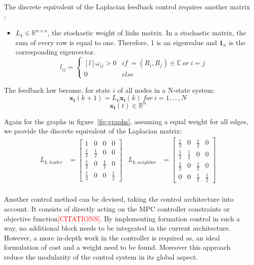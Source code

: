 \documentclass[a4paper, 12pt]{report}
\begin{document}
The discrete equivalent of the Laplacian feedback control requires another matrix \cite{Moreau2005}:
\begin{itemize}
\item $L_k \in \mathbb{R}^{n \times n}$, the stochastic weight of links matrix. In a stochastic matrix, the sum of every row is equal to one. Therefore, 1 is an eigenvalue and $\boldsymbol{1}_n$ is the corresponding eigenvector.
\[l_{ij} =  \left\{ \begin{matrix*}[l] \omega_{ij} > 0 & if\  = (R_i, R_j) \in \mathbb{E}\ or\ i=j\\ 0 & else \end{matrix*} \right.\]
\end{itemize}

The feedback law become, for state $i$ of all nodes in a N-state system:
\[ \boldsymbol{x_i}(k+1) = L_k\boldsymbol{x_i}(k)\ for\ i=1, ..., N \]
\[\boldsymbol{x_i}(t) \in \mathbb{R}^n\]

Again for the graphs in figure~\ref{fig:graphs}, assuming a equal weight for all edges, we provide the discrete equivalent of the Laplacian matrix:
\begin{displaymath}
\begin{aligned}
L_{k,leader} &= \begin{bmatrix} 1 & 0 & 0 & 0 \\ \frac{1}{2} & \frac{1}{2} & 0 & 0 \\ \frac{1}{2} & 0 & \frac{1}{2} & 0 \\ \frac{1}{2} & 0 & 0 & \frac{1}{2}\end{bmatrix} 		& L_{k,neighbor} &= \begin{bmatrix} \frac{1}{2} & 0 & \frac{1}{2} & 0 \\ \frac{1}{2} & \frac{1}{2} & 0 & 0 \\ \frac{1}{2} & 0 & \frac{1}{2} & 0 \\ 0 & 0 & \frac{1}{2} & \frac{1}{2}\end{bmatrix} \\
\end{aligned}
\end{displaymath}

Another control method can be devised, taking the control architecture into account. It consists of directly acting on the MPC controller constraints or objective function\textcolor{red}{[CITATIONS]}.  By implementing formation control in such a way, no additional block needs to be integrated in the current architecture. However, a more in-depth work in the controller is required as, an ideal formulation of cost and a weight need to be found. Moreover this approach reduce the modularity of the control system in its global aspect.
\end{document}
